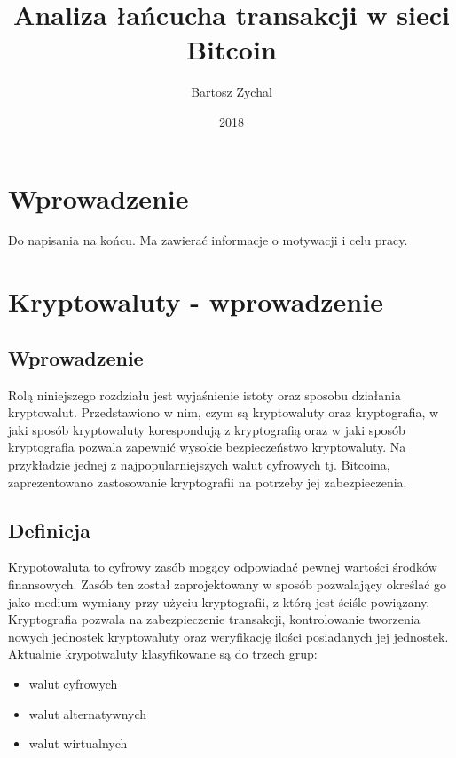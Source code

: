\documentclass[12pt, twoside, final, openany]{mgr}
\title{Analiza łańcucha transakcji w sieci Bitcoin}
\author{Bartosz Zychal}
\date{2018} %
\begin{document}
\def\listtablename{Spis tabel. }
\def\tablename{Tabela. }
\maketitle %

\chapter*{Wprowadzenie}
Do napisania na końcu. Ma zawierać informacje o motywacji i celu pracy. 


\chapter{Kryptowaluty - wprowadzenie}

\section{Wprowadzenie} 
\label{sec:KryptowalutyWprowadzenie}
\indent Rolą niniejszego rozdziału jest wyjaśnienie istoty oraz sposobu działania kryptowalut. Przedstawiono w nim, czym są kryptowaluty oraz kryptografia, w jaki sposób kryptowaluty korespondują z kryptografią oraz w jaki sposób kryptografia pozwala zapewnić wysokie bezpieczeństwo kryptowaluty. Na przykładzie jednej z najpopularniejszych walut cyfrowych tj. Bitcoina, zaprezentowano zastosowanie kryptografii na potrzeby jej zabezpieczenia.

\section{Definicja} \label{sec:definicjaKryptowaluty}
\indent Krypotowaluta to cyfrowy zasób mogący odpowiadać pewnej wartości środków finansowych. Zasób ten został zaprojektowany w sposób pozwalający określać go jako medium wymiany przy użyciu kryptografii, z którą jest ściśle powiązany. Kryptografia pozwala na zabezpieczenie transakcji, kontrolowanie tworzenia nowych jednostek kryptowaluty oraz weryfikację ilości posiadanych jej jednostek. Aktualnie krypotwaluty klasyfikowane są do trzech grup:
\begin{itemize}
\item walut cyfrowych
\item walut alternatywnych
\item walut wirtualnych
\end{itemize}
\end{document}
